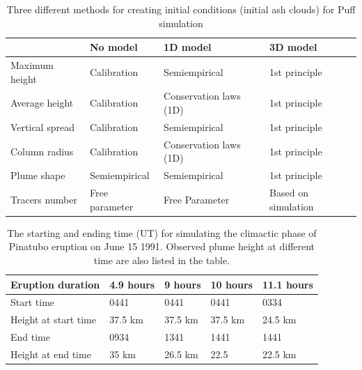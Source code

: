 \documentclass[utf8]{frontiersSCNS} %
\begin{document}
\begin{table}
\centering
\caption{Three different methods for creating initial conditions (initial ash clouds) for Puff simulation}		
	 \begin{tabular}{p{26.5mm}p{25.5mm}p{36.5mm}p{34.5mm}}
	 \hline
	 		 & No model & 1D model & 3D model \\
	 		 \hline 		
	 Maximum height & Calibration & Semiempirical & 1st principle \\
	 Average height & Calibration & Conservation laws (1D) & 1st principle \\
	 Vertical spread & Calibration & Semiempirical & 1st principle \\
	 Column radius & Calibration & Conservation laws (1D) & 1st principle \\
	 Plume shape & Semiempirical & Semiempirical & 1st principle \\
	 Tracers number & Free parameter & Free Parameter & Based on simulation\\
	 \hline
	 \end{tabular}
	 \label{tab:VATDs-source-term-determination}
\end{table}

\begin{table}[htp]
\centering
\caption{The starting and ending time (UT) for simulating the climactic phase of Pinatubo eruption on June 15 1991. Observed plume height \citep{holasek1996satellite} at different time are also listed in the table.}		
	 \begin{tabular}{p{35mm}p{20mm}p{20mm}p{20mm}p{20mm}}
	 \hline
Eruption duration & 4.9 hours & 9 hours & 10 hours & 11.1 hours \\
	 \hline
	 Start time & 0441 & 0441 & 0441 & 0334 \\
	 Height at start time & 37.5 km & 37.5 km & 37.5 km & 24.5 km \\
	
	 End time & 0934 & 1341 & 1441 & 1441 \\
	 	Height at end time & 35 km & 26.5 km & 22.5 & 22.5 km \\
	 \hline
	 \end{tabular}
	 \label{tab:Pinatubo-eruption-duration}
\end{table}
\end{document}
